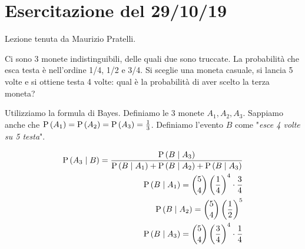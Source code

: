 \section{Esercitazione del 29/10/19}

Lezione tenuta da Maurizio Pratelli.

\begin{exrc}
    Ci sono 3 monete indistinguibili, delle quali due sono truccate.
    La probabilit\`a che esca testa \`e nell'ordine 1/4, 1/2 e 3/4.
    Si sceglie una moneta casuale, si lancia 5 volte e si ottiene testa 4 volte: qual \`e la probabilit\`a di aver scelto la terza moneta?

    Utilizziamo la formula di Bayes. Definiamo le 3 monete $A_1, A_2, A_3$. Sappiamo anche che $ \text{P}\left(A_1\right) = \text{P}\left(A_2\right) = \text{P}\left(A_3\right) = \frac{1}{3} $. Definiamo l'evento $ B $ come "\textit{esce 4 volte su 5 testa}".

    \begin{equation*}
        \begin{aligned}
            \text{P}\left(A_3 \mid B\right) = \dfrac{\text{P}\left(B \mid A_3\right)}{\text{P}\left(B \mid A_1\right) + \text{P}\left(B \mid A_2\right) + \text{P}\left(B \mid A_3\right)} \\
            \text{P}\left(B \mid A_1\right) = \binom{5}{4} \left(\dfrac{1}{4}\right)^4 \cdot \dfrac{3}{4}\\
            \text{P}\left(B \mid A_2\right) = \binom{5}{4} \left(\dfrac{1}{2}\right)^5 \\
            \text{P}\left(B \mid A_3\right) = \binom{5}{4} \left(\dfrac{3}{4}\right)^4 \cdot \dfrac{1}{4}\\
        \end{aligned}
    \end{equation*}
\end{exrc}

